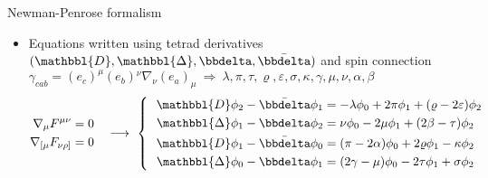 \documentclass[9pt,serif,mathserif]{beamer}
\begin{document}
\begin{frame}{Newman-Penrose formalism}
\begin{itemize}
        \item Equations written using tetrad derivatives $(\mathbbl{D}, \mathbbl{\Delta}, \bbdelta, \bar{\bbdelta})$ and spin connection $\gamma_{cab} = (e_c)^\mu (e_b){}^\nu \nabla_\nu (e_a)_{\mu} ~\Rightarrow~ \lambda, \pi, \tau, \varrho, \varepsilon, \sigma,\kappa, \gamma ,\mu, \nu, \alpha,\beta$
        \begin{equation*}
            \begin{aligned}[c]
                \nabla_\mu F^{\mu\nu} &= 0 \\
                \nabla_{[\mu} F_{\nu\rho]} &= 0
            \end{aligned}
            \quad\longrightarrow~\left\{~~
            \begin{aligned}[c]
                \mathbbl{D} \phi_2 - \bar{\bbdelta} \phi_1 &= -\lambda \phi_0 + 2 \pi \phi_1 + (\varrho - 2 \varepsilon) \phi_2 \\
                \mathbbl{\Delta} \phi_1 - \bbdelta \phi_2 &= \nu \phi_0 - 2 \mu \phi_1 + (2\beta-\tau) \phi_2 \\
                \mathbbl{D} \phi_1 - \bar{\bbdelta} \phi_0 &= (\pi - 2 \alpha) \phi_0 + 2 \varrho \phi_1 - \kappa \phi_2 \\
                \mathbbl{\Delta} \phi_0 - \bbdelta \phi_1 &= (2 \gamma - \mu) \phi_0 - 2 \tau \phi_1 + \sigma \phi_2
            \end{aligned}
            \right.
        \end{equation*}
    \end{itemize}
\end{frame}
\end{document}
